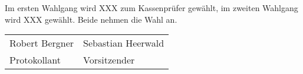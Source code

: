 \documentclass[a4paper,12pt,titlepage]{scrartcl}
\begin{document}
Im ersten Wahlgang wird XXX zum Kassenprüfer gewählt, im zweiten Wahlgang wird XXX gewählt.
Beide nehmen die Wahl an.

\nopagebreak
\vspace{10\baselineskip}
\begin{tabularx}{\textwidth}[b]{X X}
	\hline
	Robert Bergner & Sebastian Heerwald \\
	Protokollant & Vorsitzender
\end{tabularx}

\appendix

\end{document}
